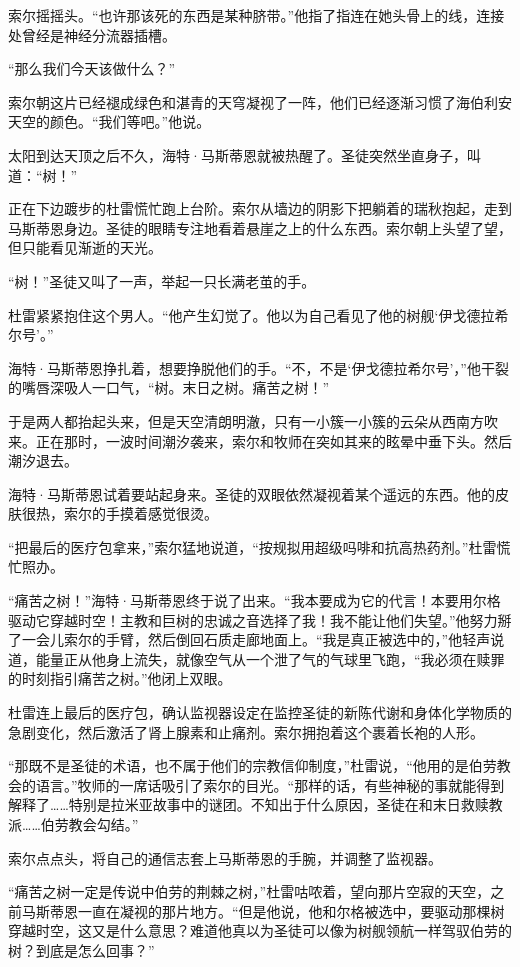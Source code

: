 \documentclass[AutoFakeBold=true]{book}
\begin{document}
索尔摇摇头。``也许那该死的东西是某种脐带。''他指了指连在她头骨上的线，连接处曾经是神经分流器插槽。

``那么我们今天该做什么？''

索尔朝这片已经褪成绿色和湛青的天穹凝视了一阵，他们已经逐渐习惯了海伯利安天空的颜色。``我们等吧。''他说。

\vspace*{1em}

太阳到达天顶之后不久，海特·马斯蒂恩就被热醒了。圣徒突然坐直身子，叫道：``树！''

正在下边踱步的杜雷慌忙跑上台阶。索尔从墙边的阴影下把躺着的瑞秋抱起，走到马斯蒂恩身边。圣徒的眼睛专注地看着悬崖之上的什么东西。索尔朝上头望了望，但只能看见渐逝的天光。

``树！''圣徒又叫了一声，举起一只长满老茧的手。

杜雷紧紧抱住这个男人。``他产生幻觉了。他以为自己看见了他的树舰`伊戈德拉希尔号'。''

海特·马斯蒂恩挣扎着，想要挣脱他们的手。``不，不是`伊戈德拉希尔号'，''他干裂的嘴唇深吸人一口气，``树。末日之树。痛苦之树！''

于是两人都抬起头来，但是天空清朗明澈，只有一小簇一小簇的云朵从西南方吹来。正在那时，一波时间潮汐袭来，索尔和牧师在突如其来的眩晕中垂下头。然后潮汐退去。

海特·马斯蒂恩试着要站起身来。圣徒的双眼依然凝视着某个遥远的东西。他的皮肤很热，索尔的手摸着感觉很烫。

``把最后的医疗包拿来，''索尔猛地说道，``按规拟用超级吗啡和抗高热药剂。''杜雷慌忙照办。

``痛苦之树！''海特·马斯蒂恩终于说了出来。``我本要成为它的代言！本要用尔格驱动它穿越时空！主教和巨树的忠诚之音选择了我！我不能让他们失望。''他努力掰了一会儿索尔的手臂，然后倒回石质走廊地面上。``我是真正被选中的，''他轻声说道，能量正从他身上流失，就像空气从一个泄了气的气球里飞跑，``我必须在赎罪的时刻指引痛苦之树。''他闭上双眼。

杜雷连上最后的医疗包，确认监视器设定在监控圣徒的新陈代谢和身体化学物质的急剧变化，然后激活了肾上腺素和止痛剂。索尔拥抱着这个裹着长袍的人形。

``那既不是圣徒的术语，也不属于他们的宗教信仰制度，''杜雷说，``他用的是伯劳教会的语言。''牧师的一席话吸引了索尔的目光。``那样的话，有些神秘的事就能得到解释了……特别是拉米亚故事中的谜团。不知出于什么原因，圣徒在和末日救赎教派……伯劳教会勾结。''

索尔点点头，将自己的通信志套上马斯蒂恩的手腕，并调整了监视器。

``痛苦之树一定是传说中伯劳的荆棘之树，''杜雷咕哝着，望向那片空寂的天空，之前马斯蒂恩一直在凝视的那片地方。``但是他说，他和尔格被选中，要驱动那棵树穿越时空，这又是什么意思？难道他真以为圣徒可以像为树舰领航一样驾驭伯劳的树？到底是怎么回事？''
\end{document}
